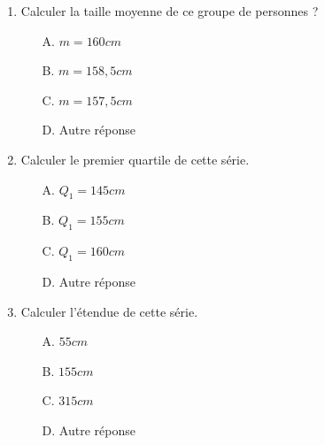 \documentclass{article}
\begin{document}
\begin{enumerate}[label=\textbf{Question \arabic*.}]
    \item Calculer la taille moyenne de ce groupe de personnes ?
    \vspace{0.5cm} 
    \begin{itemize}[label=]
        \item[A.] \( m=160 cm \) \vspace{0.5cm} 
        \item[B.] \( m=158,5 cm\) \vspace{0.5cm} 
        \item[C.] \( m=157,5 cm \) \vspace{0.5cm} 
        \item[D.] Autre réponse
    \end{itemize}
    \vspace{0.5cm} 
    \item Calculer le premier quartile de cette série.
    \vspace{0.5cm}
    \begin{itemize}[label=]
        \item[A.] \( Q_1 = 145 cm \) \vspace{0.5cm} 
        \item[B.] \( Q_1 = 155 cm\) \vspace{0.5cm} 
        \item[C.] \( Q_1 = 160 cm \) \vspace{0.5cm} 
        \item[D.] Autre réponse
    \end{itemize}
    \vspace{0.5cm} 
        \item Calculer l'étendue de cette série.
    \vspace{0.5cm}
    \begin{itemize}[label=]
        \item[A.] \( 55 cm \) \vspace{0.5cm} 
        \item[B.] \( 155 cm \) \vspace{0.5cm} 
        \item[C.] \( 315 cm \) \vspace{0.5cm} 
        \item[D.] Autre réponse
    \end{itemize}
\end{enumerate}


\newpage
\end{document}
